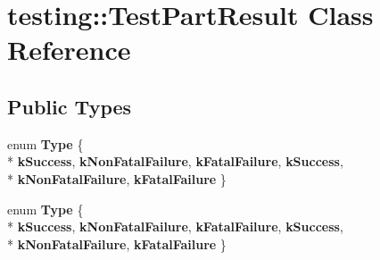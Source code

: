 \hypertarget{classtesting_1_1_test_part_result}{}\section{testing\+:\+:Test\+Part\+Result Class Reference}
\label{classtesting_1_1_test_part_result}
\subsection*{Public Types}
\begin{DoxyCompactItemize}
\item 
\hypertarget{classtesting_1_1_test_part_result_a65ae656b33fdfdfffaf34858778a52d5}{}enum {\bfseries Type} \{ \\*
{\bfseries k\+Success}, 
{\bfseries k\+Non\+Fatal\+Failure}, 
{\bfseries k\+Fatal\+Failure}, 
{\bfseries k\+Success}, 
\\*
{\bfseries k\+Non\+Fatal\+Failure}, 
{\bfseries k\+Fatal\+Failure}
 \}\label{classtesting_1_1_test_part_result_a65ae656b33fdfdfffaf34858778a52d5}

\item 
\hypertarget{classtesting_1_1_test_part_result_a65ae656b33fdfdfffaf34858778a52d5}{}enum {\bfseries Type} \{ \\*
{\bfseries k\+Success}, 
{\bfseries k\+Non\+Fatal\+Failure}, 
{\bfseries k\+Fatal\+Failure}, 
{\bfseries k\+Success}, 
\\*
{\bfseries k\+Non\+Fatal\+Failure}, 
{\bfseries k\+Fatal\+Failure}
 \}\label{classtesting_1_1_test_part_result_a65ae656b33fdfdfffaf34858778a52d5}

\end{DoxyCompactItemize}

